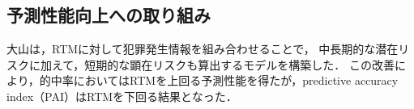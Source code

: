 
\subsection{予測性能向上への取り組み}
大山\cite{大山智也2020日本}は，RTMに対して犯罪発生情報を組み合わせることで，
中長期的な潜在リスクに加えて，短期的な顕在リスクも算出するモデルを構築した．
この改善により，的中率においてはRTMを上回る予測性能を得たが，predictive accuracy index（PAI）はRTMを下回る結果となった．

